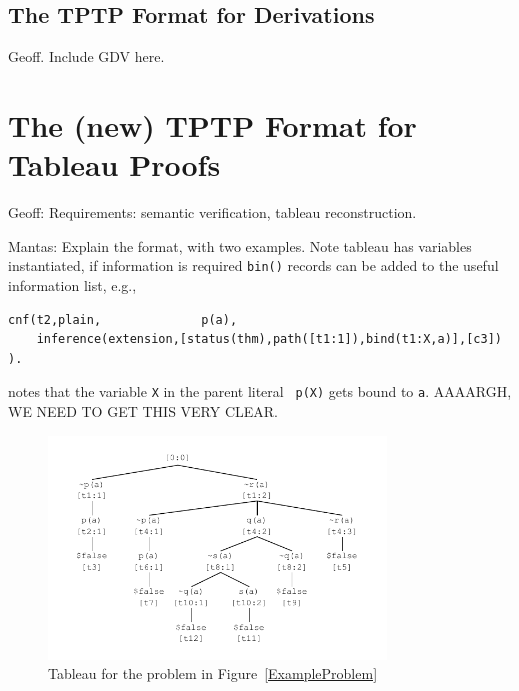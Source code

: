 \documentclass[runningheads]{llncs}
\begin{document}
\subsection{The TPTP Format for Derivations}
\label{Derivations}

Geoff. Include GDV here.

\section{The (new) TPTP Format for Tableau Proofs}
\label{Tableau}

Geoff: Requirements: semantic verification, tableau reconstruction.

Mantas: Explain the format, with two examples.
Note tableau has variables instantiated, if information is required {\tt bin()} records can be
added to the useful information list, e.g., 

\begin{verbatim}
cnf(t2,plain,              p(a),
    inference(extension,[status(thm),path([t1:1]),bind(t1:X,a)],[c3]) ).
\end{verbatim}

notes that the variable {\tt X} in the parent literal {\tt ~p(X)} gets bound to {\tt a}.
AAAARGH, WE NEED TO GET THIS VERY CLEAR.

\begin{figure}[htb]
\centering
\includegraphics[width=0.8\textwidth]{SimpleTableau.pdf}
\vspace*{-1em}
\caption{Tableau for the problem in Figure~\ref{ExampleProblem}}
\label{SimpleTableau}
\end{figure}
\end{document}
